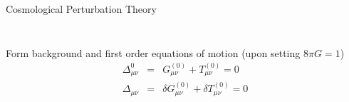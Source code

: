 \documentclass[8pt]{beamer}
\begin{document}
\begin{frame}{Cosmological Perturbation Theory}
\begin{columns}
\begin{column}{0.3\linewidth}
\begin{figure}[t]
			\end{figure}
		\end{column}
	\end{columns}
	\vspace{1em}
	Form background and first order equations of motion (upon setting $8\pi G=1$)
	\begin{eqnarray*}
		\Delta_{\mu\nu}^{0} &=& G_{\mu\nu}^{(0)} + T_{\mu\nu}^{(0)} =0
		\\
		\Delta_{\mu\nu} &=& \delta G_{\mu\nu}^{(0)} + \delta T_{\mu\nu}^{(0)}=0
	\end{eqnarray*}
	\let\thefootnote\relax{}
\end{frame}

\end{document}
